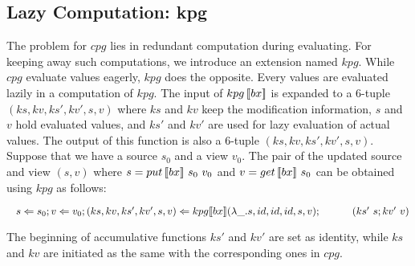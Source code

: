 


\subsection{Lazy Computation: kpg}

The problem for $cpg$ lies in redundant computation during evaluating. For keeping away such computations, we introduce an extension named $kpg$. While $cpg$ evaluate values eagerly, $kpg$ does the opposite. Every values are evaluated lazily in a computation of $kpg$. The input of $kpg \, [\![bx]\!]$ is expanded to a 6-tuple $(ks, kv, ks', kv', s, v)$ where $ks$ and $kv$ keep the modification information, $s$ and $v$ hold evaluated values, and $ks'$ and $kv'$ are used for lazy evaluation of actual values. The output of this function is also a 6-tuple $(ks, kv, ks', kv', s, v)$.\\
Suppose that we have a source $s_0$ and a view $v_0$. The pair of the updated source and view $(s, v)$ where $s = put \, [\![bx]\!] \ s_0 \ v_0$ and $v = get \, [\![bx]\!] \ s_0$ can be obtained using $kpg$ as follows:

    $\tab s \Leftarrow s_0; v \Leftarrow v_0; (ks, kv, ks', kv', s, v) \Leftarrow \kpg{bx}{\lambda \_.s}{id}{id}{id}{s}{v};\\
        \tab \qtab (ks' \ s; kv' \ v)$

The beginning of accumulative functions $ks'$ and $kv'$ are set as identity, while $ks$ and $kv$ are initiated as the same with the corresponding ones in $cpg$.

